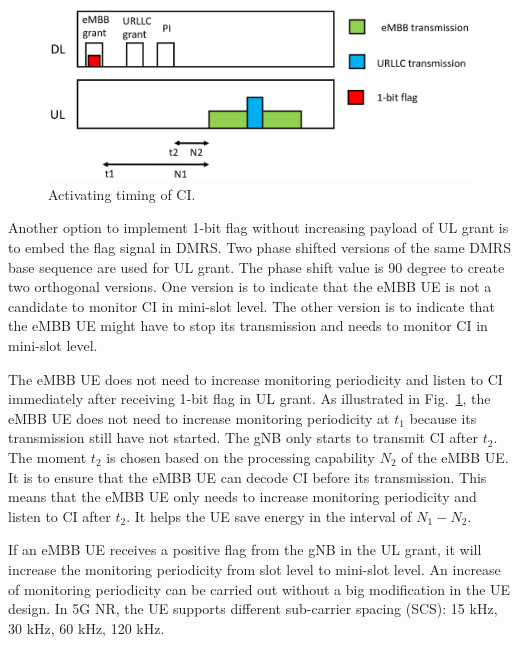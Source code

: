 \documentclass{ieeeaccess}
\begin{document}
\begin{figure}[htbp]
\centerline{\includegraphics[scale=0.17]{fig17.png}}
\caption{Activating timing of CI.}
\label{fig17}
\vspace{-2mm}
\end{figure}

Another option to implement 1-bit flag without increasing payload of UL grant is to embed the flag signal in DMRS. Two phase shifted versions of the same DMRS base sequence are used for UL grant. The phase shift value is 90 degree to create two orthogonal versions. One version is to indicate that the eMBB UE is not a candidate to monitor CI in mini-slot level. The other version is to indicate that the eMBB UE might have to stop its transmission and needs to monitor CI in mini-slot level. 

The eMBB UE does not need to increase monitoring periodicity and listen to CI immediately after receiving 1-bit flag in UL grant. As illustrated in Fig.~\ref{fig17}, the eMBB UE does not need to increase monitoring periodicity at $t_1$ because its transmission still have not started. The gNB only starts to transmit CI after $t_2$. The moment $t_2$ is chosen based on the processing capability $N_2$ of the eMBB UE. It is to ensure that the eMBB UE can decode CI before its transmission. This means that the eMBB UE only needs to increase monitoring periodicity and listen to CI after $t_2$. It helps the UE save energy in the interval of $N_1-N_2$.

If an eMBB UE receives a positive flag from the gNB in the UL grant, it will increase the monitoring periodicity from slot level to mini-slot level. An increase of monitoring periodicity can be carried out without a big modification in the UE design. In 5G NR, the UE supports different sub-carrier spacing (SCS): 15 kHz, 30 kHz, 60 kHz, 120 kHz. 
\end{document}
